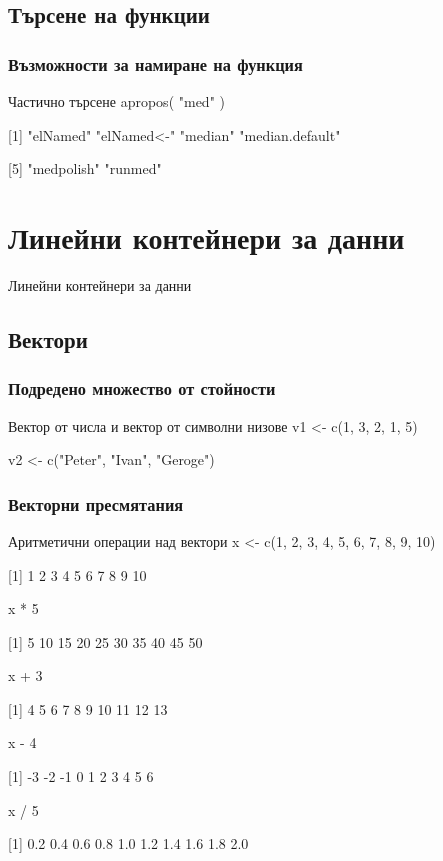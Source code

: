 \documentclass{beamer}
\begin{document}
\subsection{Търсене на функции}

\begin{frame}
\frametitle{Възможности за намиране на функция}
\begin{block}{Частично търсене}
apropos( "med" )

[1] "elNamed"        "elNamed<-"      "median"         "median.default"

[5] "medpolish"      "runmed"
\end{block}
\end{frame}

\section{Линейни контейнери за данни}

\begin{frame}
\center \huge{Линейни контейнери за данни}
\end{frame}

\subsection{Вектори}

\begin{frame}
\frametitle{Подредено множество от стойности}
\begin{block}{Вектор от числа и вектор от символни низове}
v1 <- c(1, 3, 2, 1, 5)

v2 <- c("Peter", "Ivan", "Geroge")
\end{block}
\end{frame}

\begin{frame}
\frametitle{Векторни пресмятания}
\begin{block}{Аритметични операции над вектори}
x <- c(1, 2, 3, 4, 5, 6, 7, 8, 9, 10)

[1]  1  2  3  4  5  6  7  8  9 10

x * 5

[1]  5 10 15 20 25 30 35 40 45 50

x + 3

[1]  4  5  6  7  8  9 10 11 12 13

x - 4

[1] -3 -2 -1  0  1  2  3  4  5  6

x / 5

[1] 0.2 0.4 0.6 0.8 1.0 1.2 1.4 1.6 1.8 2.0
\end{block}
\end{frame}
\end{document}
